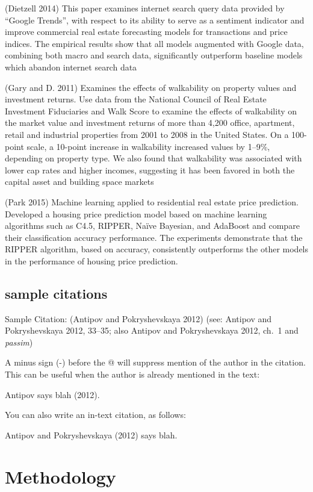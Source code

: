 \documentclass[]{article}
\begin{document}
(Dietzell 2014) This paper examines internet search query data provided
by ``Google Trends'', with respect to its ability to serve as a
sentiment indicator and improve commercial real estate forecasting
models for transactions and price indices. The empirical results show
that all models augmented with Google data, combining both macro and
search data, significantly outperform baseline models which abandon
internet search data

(Gary and D. 2011) Examines the effects of walkability on property
values and investment returns. Use data from the National Council of
Real Estate Investment Fiduciaries and Walk Score to examine the effects
of walkability on the market value and investment returns of more than
4,200 office, apartment, retail and industrial properties from 2001 to
2008 in the United States. On a 100-point scale, a 10-point increase in
walkability increased values by 1--9\%, depending on property type. We
also found that walkability was associated with lower cap rates and
higher incomes, suggesting it has been favored in both the capital asset
and building space markets

(Park 2015) Machine learning applied to residential real estate price
prediction. Developed a housing price prediction model based on machine
learning algorithms such as C4.5, RIPPER, Naïve Bayesian, and AdaBoost
and compare their classification accuracy performance. The experiments
demonstrate that the RIPPER algorithm, based on accuracy, consistently
outperforms the other models in the performance of housing price
prediction.

\subsection{sample citations}\label{sample-citations}

Sample Citation: (Antipov and Pokryshevskaya 2012) (see: Antipov and
Pokryshevskaya 2012, 33--35; also Antipov and Pokryshevskaya 2012, ch.~1
and \emph{passim})

A minus sign (-) before the @ will suppress mention of the author in the
citation. This can be useful when the author is already mentioned in the
text:

Antipov says blah (2012).

You can also write an in-text citation, as follows:

Antipov and Pokryshevskaya (2012) says blah.

\section{Methodology}\label{methodology}
\end{document}
